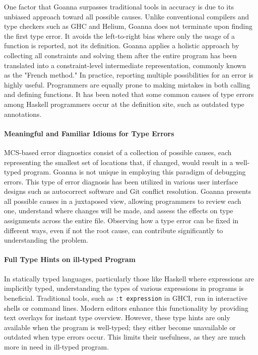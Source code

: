 \documentclass[pdflatex,sn-mathphys-num]{sn-jnl}%
\begin{document}
One factor that Goanna surpasses traditional tools in accuracy is due to its unbiased approach toward all possible causes. Unlike conventional compilers and type checkers such as GHC and Helium, Goanna does not terminate upon finding the first type error. It avoids the left-to-right bias  where only the usage of a function is reported, not its definition. Goanna applies a holistic approach by collecting all constraints and solving them after the entire program has been translated into a constraint-level intermediate representation, commonly known as the "French method." In practice, reporting multiple possibilities for an error is highly useful. Programmers are equally prone to making mistakes in both calling and defining functions. It has been noted that some common causes of type errors among Haskell programmers occur at the definition site, such as outdated type annotations.

\paragraph{Meaningful and Familiar Idioms for Type Errors}

MCS-based error diagnostics consist of a collection of possible causes, each representing the smallest set of locations that, if changed, would result in a well-typed program. Goanna is not unique in employing this paradigm of debugging errors. This type of error diagnosis has been utilized in various user interface designs such as autocorrect software and Git conflict resolution. Goanna presents all possible causes in a juxtaposed view, allowing programmers to review each one, understand where changes will be made, and assess the effects on type assignments across the entire file. Observing how a type error can be fixed in different ways, even if not the root cause, can contribute significantly to understanding the problem.

\paragraph{Full Type Hints on ill-typed Program}

In statically typed languages, particularly those like Haskell where expressions are implicitly typed, understanding the types of various expressions in programs is beneficial. Traditional tools, such as \texttt{:t expression} in GHCI, run in interactive shells or command lines. Modern editors enhance this functionality by providing text overlays for instant type overview. However, these type hints are only available when the program is well-typed; they either become unavailable or outdated when type errors occur. This limits their usefulness, as they are much more in need in ill-typed program.
\end{document}
